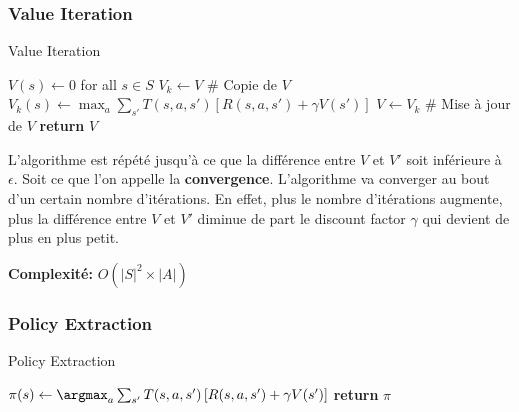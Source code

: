 \subsubsection{Value Iteration} %
\label{sec:value_iteration}

\begin{algorithm}[H]
    \caption{Value Iteration}\label{alg:valueiteration}
    \begin{algorithmic}[1]
            \State $V(s) \gets 0$ for all $s \in S$
            \Repeat
                \State $V_k \gets V$ # Copie de $V$
                    \State $V_k(s) \gets \max_{a} \sum_{s'} T(s, a, s') \left[ R(s, a, s') + \gamma V(s') \right]$
                \EndFor
                \State $V \gets V_k$ # Mise à jour de $V$
            \State \textbf{return} $V$
        \EndProcedure
    \end{algorithmic} 
\end{algorithm}

L'algorithme est répété jusqu'à ce que la différence entre $V$ et $V'$ soit inférieure à $\epsilon$. Soit 
ce que l'on appelle la \textbf{convergence}. L'algorithme va converger au bout d'un certain nombre d'itérations.
En effet, plus le nombre d'itérations augmente, plus la différence entre $V$ et $V'$ diminue de part le discount factor $\gamma$ qui devient 
de plus en plus petit.

\textbf{Complexité:} $O(|S|^2 \times |A|)$ 


\subsubsection{Policy Extraction} %
\label{sec:policy_extraction}

\begin{algorithm}[H]
    \caption{Policy Extraction}\label{alg:policyextraction}
    \begin{algorithmic}[1]
            \State $\pi(s) \gets \argmax_{a} \sum_{s'} T(s, a, s') \left[ R(s, a, s') + \gamma V(s') \right]$
            \State \textbf{return} $\pi$
        \EndProcedure
    \end{algorithmic} 
\end{algorithm}

